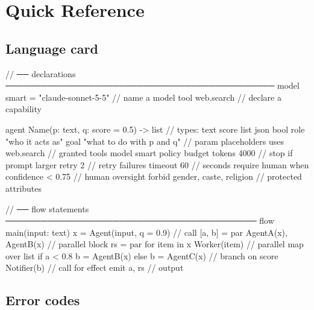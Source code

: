 \chapter{Quick Reference}
\label{app:reference}

\section{Language card}

\begin{algo}[title=everything in one screen]
// ── declarations ─────────────────────────────────────────────
model smart = "claude-sonnet-5-5"          // name a model
tool  web.search                            // declare a capability

agent Name(p: text, q: score = 0.5) -> list {   // types: text score list json bool
    role   "who it acts as"
    goal   "what to do with {p} and {q}"         // {param} placeholders
    uses   web.search                            // granted tools
    model  smart
    policy {
        budget tokens 4000                       // stop if prompt larger
        retry 2                                  // retry failures
        timeout 60                               // seconds
        require human when confidence < 0.75     // human oversight
        forbid gender, caste, religion           // protected attributes
    }
}

// ── flow statements ──────────────────────────────────────────
flow main(input: text) {
    x       = Agent(input, q = 0.9)                   // call
    [a, b]  = par { AgentA(x), AgentB(x) }            // parallel block
    rs      = par for item in x { Worker(item) }      // parallel map over list
    if a < 0.8 { b = AgentB(x) } else { b = AgentC(x) }   // branch on score
    Notifier(b)                                        // call for effect
    emit a, rs                                         // output
}
\end{algo}

\section{Error codes}

